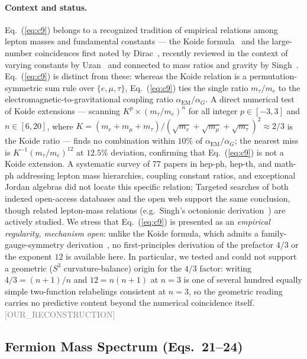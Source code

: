 \documentclass[twocolumn,prd,amsmath,amssymb,floatfix]{revtex4-2}
\newcommand{\reconstruction}{\textcolor{gray}{\small[OUR\_RECONSTRUCTION]}}
\begin{document}
\paragraph{Context and status.}
Eq.~(\ref{eq:c9}) belongs to a recognized tradition of empirical relations
among lepton masses and fundamental constants --- the Koide
formula~\cite{sumino2009koide,xing2006koide,lima2006koide} and the
large-number coincidences first noted by Dirac~\cite{dirac1937}, recently
reviewed in the context of varying constants by Uzan~\cite{uzan2025constants}
and connected to mass ratios and gravity by Singh~\cite{singh2022massratios}.
Eq.~(\ref{eq:c9}) is distinct from these: whereas the Koide relation is a
permutation-symmetric sum rule over $\{e,\mu,\tau\}$, Eq.~(\ref{eq:c9}) ties
the single ratio $m_\tau/m_e$ to the electromagnetic-to-gravitational coupling
ratio $\alpha_\mathrm{EM}/\alpha_G$. A direct numerical test of Koide
extensions --- scanning $K^p \times (m_\tau/m_e)^n$ for all integer $p \in [-3,3]$
and $n \in [6,20]$, where $K = (m_e+m_\mu+m_\tau)/(\sqrt{m_e}+\sqrt{m_\mu}+\sqrt{m_\tau})^2
\approx 2/3$ is the Koide ratio --- finds no combination within $10\%$ of
$\alpha_\mathrm{EM}/\alpha_G$; the nearest miss is $K^{-1}(m_\tau/m_e)^{12}$
at $12.5\%$ deviation, confirming that Eq.~(\ref{eq:c9}) is not a Koide extension.
A systematic survey of 77 papers in hep-ph, hep-th, and math-ph addressing
lepton mass hierarchies, coupling constant ratios, and exceptional Jordan algebras
did not locate this specific relation; Targeted searches of both indexed
open-access databases and the open web support the same conclusion,
though related lepton-mass relations (e.g.~Singh's octonionic
derivation~\cite{singh2022massratios}) are actively studied.
We stress that Eq.~(\ref{eq:c9}) is presented as an \emph{empirical regularity,
mechanism open}: unlike the Koide formula, which admits a family-gauge-symmetry
derivation~\cite{sumino2009koide}, no first-principles derivation of the
prefactor $4/3$ or the exponent $12$ is available here. In particular, we
tested and could not support a geometric ($S^3$ curvature-balance) origin for
the $4/3$ factor: writing $4/3 = (n+1)/n$ and $12 = n(n+1)$ at $n=3$ is one of
several hundred equally simple two-function relabelings consistent at $n=3$,
so the geometric reading carries no predictive content beyond the numerical
coincidence itself.
\reconstruction

\subsection{Fermion Mass Spectrum (Eqs.~21--24)}
\label{ssec:fermions}
\end{document}
